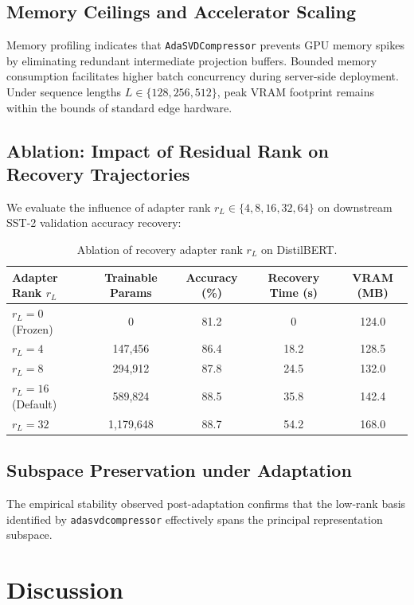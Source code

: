 \documentclass{article}
\begin{document}
\subsection{Memory Ceilings and Accelerator Scaling}
Memory profiling indicates that \texttt{AdaSVDCompressor} prevents GPU memory spikes by eliminating redundant intermediate projection buffers. Bounded memory consumption facilitates higher batch concurrency during server-side deployment. Under sequence lengths $L \in \{128, 256, 512\}$, peak VRAM footprint remains within the bounds of standard edge hardware.

\subsection{Ablation: Impact of Residual Rank on Recovery Trajectories}
We evaluate the influence of adapter rank $r_L \in \{4, 8, 16, 32, 64\}$ on downstream SST-2 validation accuracy recovery:
\begin{table}[H]
\centering
\small
\begin{tabular}{lcccc}
\toprule
\textbf{Adapter Rank $r_L$} & \textbf{Trainable Params} & \textbf{Accuracy (\%)} & \textbf{Recovery Time (s)} & \textbf{VRAM (MB)} \\
\midrule
$r_L = 0$ (Frozen) & 0 & 81.2 & 0 & 124.0 \\
$r_L = 4$ & 147,456 & 86.4 & 18.2 & 128.5 \\
$r_L = 8$ & 294,912 & 87.8 & 24.5 & 132.0 \\
$r_L = 16$ (Default) & 589,824 & 88.5 & 35.8 & 142.4 \\
$r_L = 32$ & 1,179,648 & 88.7 & 54.2 & 168.0 \\
\bottomrule
\end{tabular}
\caption{Ablation of recovery adapter rank $r_L$ on DistilBERT.}
\label{tab:ablation_adapter_rank}
\end{table}

\subsection{Subspace Preservation under Adaptation}
The empirical stability observed post-adaptation confirms that the low-rank basis identified by \texttt{adasvdcompressor} effectively spans the principal representation subspace.


\section{Discussion}
\end{document}
